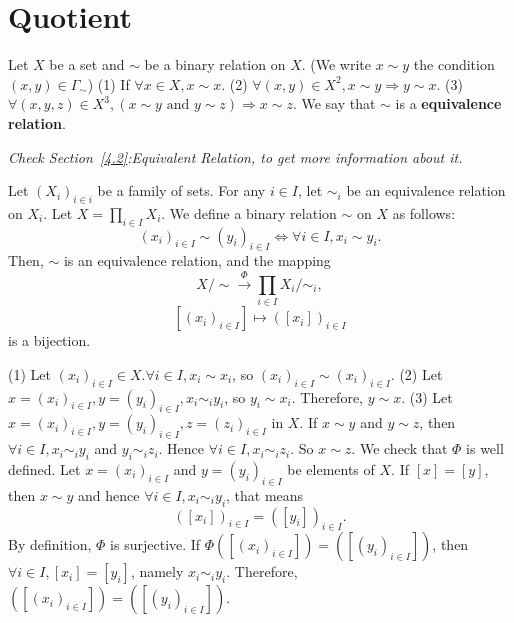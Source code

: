 \documentclass{book}
\numberwithin{equation}{section}
\begin{document}
\section{Quotient}\label{5.5}
\begin{definitionenv}
    Let $X$ be a set and $\sim$ be a binary relation on $X$. (We write $x\sim y$ the condition $(x, y)\in \Gamma_\sim$)
    \newline
    (1) If $\forall x\in X,  x\sim x$.
    \newline
    (2) $\forall (x, y)\in X^2,  x\sim y\Rightarrow y\sim x$.
    \newline
    (3) $\forall (x, y, z)\in X^3,  (x\sim y \text{ and } y\sim z )\Rightarrow x\sim z$.
    \newline
    We say that $\sim $ is a \textbf{equivalence relation}.
\end{definitionenv}
\textit{Check Section~\ref{4.2}:Equivalent Relation,  to get more information about it.}
\begin{propositionenv}
    Let $(X_i)_{i\in i}$ be a family of sets. For any $i\in I$,  let $\sim_i$ be an equivalence relation on $X_i$. Let $X=\prod_{i\in I}X_i$. We define a binary relation $\sim$ on $X$ as follows:
    $$(x_i)_{i\in I}\sim (y_i)_{i\in I}\Leftrightarrow \forall i\in I,  x_i\sim y_i.$$
    Then,  $\sim $ is an equivalence relation,  and the mapping
    $$X/\sim \overset{\Phi}{\longrightarrow }\prod_{i\in I}X_i/\sim_i, $$
    $$ [(x_i)_{i\in I}]\longmapsto  ([x_i])_{i\in I}$$
    is a bijection.
\end{propositionenv}
\begin{proofenv}
    \quad
    \newline
    (1) Let $(x_i)_{i\in I}\in X. \forall i\in I, x_i\sim x_i$,  so $(x_i)_{i\in I}\sim(x_i)_{i\in I}$.
    \newline
    (2) Let $x=(x_i)_{i\in I}, y=(y_i)_{i\in I},  x_i\sim_i y_i$,  so $y_i\sim x_i$. Therefore,  $y\sim x$.
    \newline 
    (3) Let $x=(x_i)_{i\in I}, y=(y_i)_{i\in I}, z=(z_i)_{i\in I}$ in $X$. If $x\sim y$ and $y\sim z$,  then $\forall i \in I, x_i\sim_i y_i$ and $y_i\sim_i z_i$. Hence $\forall i \in I,  x_i\sim_i z_i$. So $x\sim z$.
    \newline
    We check that $\Phi$ is well defined. Let $x=(x_i)_{i\in I}$ and $y=(y_i)_{i\in I}$ be elements of $X$. If $[x]=[y]$,  then $x\sim y$ and hence $\forall i\in I,  x_i\sim_i y_i$,  that means 
    $$([x_i])_{i\in I}=([y_i])_{i\in I}.$$
    By definition,  $\Phi$ is surjective. If $\Phi([(x_i)_{i\in I}])=([(y_i)_{i\in I}])$,  then $\forall i\in I,  [x_i]=[y_i]$,  namely $x_i\sim_i y_i$. Therefore,  $([(x_i)_{i\in I}])=([(y_i)_{i\in I}])$.
\end{proofenv}
\end{document}
